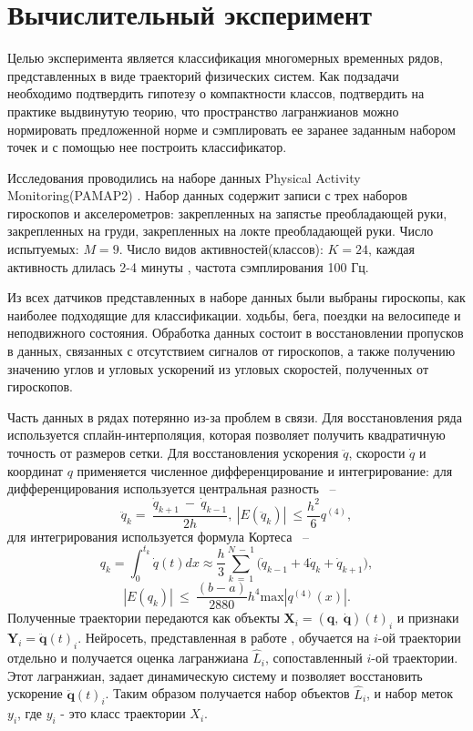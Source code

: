 \documentclass[12pt, twoside]{article}
\begin{document}
\section{Вычислительный эксперимент}
 Целью эксперимента является классификация многомерных временных рядов, представленных в виде траекторий физических систем. Как подзадачи необходимо подтвердить гипотезу о компактности классов, подтвердить на практике выдвинутую теорию, что пространство лагранжианов можно нормировать предложенной норме и сэмплировать ее заранее заданным набором точек и с помощью нее построить классификатор.

    Исследования проводились на наборе данных Physical Activity Monitoring(PAMAP2) \cite{dataset}.
 Набор данных содержит записи с трех наборов гироскопов и акселерометров: закрепленных на запястье преобладающей руки, закрепленных на груди, закрепленных на локте преобладающей руки. Число испытуемых: $M = 9$. Число видов активностей(классов): $K = 24$, каждая активность длилась 2-4 минуты \cite{dataset}, частота сэмплирования 100 Гц.


 Из всех датчиков представленных в наборе данных были выбраны гироскопы, как наиболее подходящие для классификации. ходьбы, бега, поездки на велосипеде и неподвижного состояния. Обработка данных состоит в восстановлении пропусков в данных, связанных с отсутствием сигналов от гироскопов, а также получению значению углов и угловых ускорений из угловых скоростей, полученных от гироскопов.
 
 Часть данных в рядах потерянно из-за проблем в связи. Для восстановления ряда используется сплайн-интерполяция, которая позволяет получить квадратичную точность от размеров сетки. Для восстановления ускорения $\ddot{q}$, скорости $\dot{q}$ и координат $q$ применяется численное дифференцирование и интегрирование: 
 для дифференцирования используется центральная разность ~--
\begin{equation}
\ddot{q}_k =\ \frac{\dot{q}_{k+1}\ -\ \dot{q}_{k-1}}{2h},\ \left|E(\ddot{q}_k)\right|\ \le \frac{h^2}{6}q^{(4)},
\end{equation}
для интегрирования используется формула Кортеса ~--
\begin{equation}
q_k = \int_{0}^{t_k}{\dot{q}(t)dx}\approx\frac{h}{3}\sum_{k\ =\ 1}^{N\ -\ 1}{\Big(\dot{q}_{k-1}+4\dot{q}_k+\dot{q}_{k+1}\Big)},
\end{equation}
\begin{equation}
\left|E(q_k)\right|\ \le\ \frac{(b-a)}{2880}h^4\text{max}\left|q^{(4)}\left(x\right)\right|.
\end{equation}
Полученные траектории передаются как объекты $\mathbf{X}_i = (\mathbf{q},\ \mathbf{\dot{q}})(t)_i$ и признаки $\mathbf{Y}_i = \ddot{\mathbf{q}}(t)_i$. Нейросеть, представленная в работе \cite{article}, обучается на $i$-ой траектории отдельно и получается оценка лагранжиана $\hat{L}_i$, сопоставленный $i$-ой траектории. Этот лагранжиан, задает динамическую систему и позволяет восстановить ускорение $\ddot{\mathbf{q}}(t)_i$. Таким образом получается набор объектов $\hat{L}_i$, и набор меток $y_i$, где $y_i$ - это класс траектории $X_i$.
\end{document}
